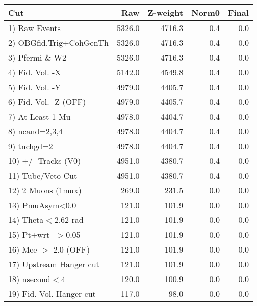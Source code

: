  \begin{table}[h!]\centering
 \begin{tabular}{||l||r|r|r|r||}
 \hline
 \hline
 Cut & Raw & Z-weight & Norm0 & Final \\
 \hline
  1) Raw Events           &      5326.0 &      4716.3 &         0.4 &         0.0 \\
  2) OBGfid,Trig+CohGenTh &      5326.0 &      4716.3 &         0.4 &         0.0 \\
  3) Pfermi \& W2         &      5326.0 &      4716.3 &         0.4 &         0.0 \\
  4) Fid. Vol. -X         &      5142.0 &      4549.8 &         0.4 &         0.0 \\
  5) Fid. Vol. -Y         &      4979.0 &      4405.7 &         0.4 &         0.0 \\
  6) Fid. Vol. -Z (OFF)   &      4979.0 &      4405.7 &         0.4 &         0.0 \\
  7) At Least 1 Mu        &      4978.0 &      4404.7 &         0.4 &         0.0 \\
  8) ncand=2,3,4          &      4978.0 &      4404.7 &         0.4 &         0.0 \\
  9) tnchgd=2             &      4978.0 &      4404.7 &         0.4 &         0.0 \\
 10) +/- Tracks (V0)      &      4951.0 &      4380.7 &         0.4 &         0.0 \\
 11) Tube/Veto Cut        &      4951.0 &      4380.7 &         0.4 &         0.0 \\
 12) 2 Muons (1mux)       &       269.0 &       231.5 &         0.0 &         0.0 \\
 13) PmuAsym<0.0          &       121.0 &       101.9 &         0.0 &         0.0 \\
 14) Theta$<$2.62 rad     &       121.0 &       101.9 &         0.0 &         0.0 \\
 15) Pt+wrt- $>$0.05      &       121.0 &       101.9 &         0.0 &         0.0 \\
 16) Mee $>$ 2.0  (OFF)   &       121.0 &       101.9 &         0.0 &         0.0 \\
 17) Upstream Hanger cut  &       121.0 &       101.9 &         0.0 &         0.0 \\
 18) nsecond$<$4          &       120.0 &       100.9 &         0.0 &         0.0 \\
 19) Fid. Vol. Hanger cut &       117.0 &        98.0 &         0.0 &         0.0 \\

\end{tabular}
\end{table}
